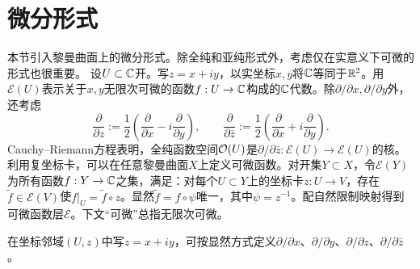 \section{微分形式}
本节引入黎曼曲面上的微分形式。除全纯和亚纯形式外，考虑仅在实意义下可微的形式也很重要。
设$U\subset\mathbb C$开。写$z=x+iy$，以实坐标$x,y$将$\mathbb C$等同于$\mathbb R^2$。用$\mathcal E(U)$表示关于$x,y$无限次可微的函数$f:U\to\mathbb C$构成的$\mathbb C$代数。除$\partial/\partial x,\partial/\partial y$外，还考虑
\[
\frac\partial{\partial z}:=\frac12\left(\frac\partial{\partial x}-i\frac\partial{\partial y}\right),\qquad
\frac\partial{\partial\bar z}:=\frac12\left(\frac\partial{\partial x}+i\frac\partial{\partial y}\right).
\]
Cauchy--Riemann方程表明，全纯函数空间$\mathcal O(U)$是$\partial/\partial\bar z:\mathcal E(U)\to\mathcal E(U)$的核。
利用复坐标卡，可以在任意黎曼曲面$X$上定义可微函数。对开集$Y\subset X$，令$\mathcal E(Y)$为所有函数$f:Y\to\mathbb C$之集，满足：对每个$U\subset Y$上的坐标卡$z:U\to V$，存在$\widetilde f\in\mathcal E(V)$使$f|_U=\widetilde f\circ z$。显然$\widetilde f=f\circ\psi$唯一，其中$\psi=z^{-1}$。配自然限制映射得到可微函数层$\mathcal E$。下文“可微”总指无限次可微。

在坐标邻域$(U,z)$中写$z=x+iy$，可按显然方式定义$\partial/\partial x$、$\partial/\partial y$、$\partial/\partial z$、$\partial/\partial\bar z$。

